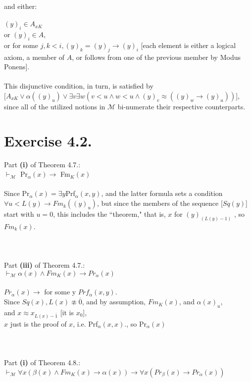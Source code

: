 \documentclass{article}
\begin{document}
and either:\\\\
$(y)_{i} \in A_{xK}$\\ or $(y)_{i} \in A$, \\or for some $j, k < i, (y)_{k} = (y)_{j} \rightarrow (y)_{i}$ [each element is either a logical axiom, a member of $A$, or follows from one of the previous member by Modus Ponens].\\\\
This disjunctive condition, in turn, is satisfied  by $[A_{xK} \vee \alpha((y)_{u}) \vee  \exists v \exists w ( v < u \wedge w < u \wedge (y)_{v} \approx  ((y)_{w} \rightarrow (y)_{u}))$], since all of the utilized notions in $\mathscr{M}$ bi-numerate their respective counterparts. 
\section*{Exercise 4.2.}
Part \textbf{(i)} of Theorem 4.7.:\\
$\vdash_{\mathscr{M}}$ Pr$_{\alpha}(x) \rightarrow$ Fm$_{K}(x)$\\\\
Since Pr$_{\alpha}(x) = \exists y$Prf$_{\alpha}(x,y)$, and the latter formula sets a condition $\forall u < L(y) \rightarrow Fm_{k}((y)_{u})$, but since the members of the sequence [$Sq(y)$] start with $u = 0$, this includes the ``theorem," that is, $x$ for $(y)_{(L(y)-1)}$ , so $Fm_{k}(x)$.\\\\\\\\
Part \textbf{(iii)} of Theorem 4.7.:\\
$\vdash_{\mathscr{M}} \alpha(x) \wedge Fm_{K}(x) \rightarrow Pr_{\alpha}(x)$\\\\
$Pr_{\alpha}(x) \rightarrow$ for some y $Prf_{\alpha}(x,y).$\\
Since $Sq(x), L(x) \not\approx \overline{0}$, and by assumption, $Fm_{K}(x)$, and $\alpha(x)_{u}$, \\and $x \approx x_{L(x)-\overline{1}}$ [it is $x_{0}$],\\ $x$ just is the proof of $x$, i.e. Prf$_{\alpha}(x,x).$, so Pr$_{\alpha}(x)$
\\\\\\\\
Part \textbf{(i)} of Theorem 4.8.:\\
$\vdash_{\mathscr{M}} \forall x (\beta(x) \wedge Fm_{K}(x) \rightarrow \alpha(x)) \rightarrow \forall x(Pr_{\beta}(x) \rightarrow Pr_{\alpha}(x))$\\\\
\end{document}
